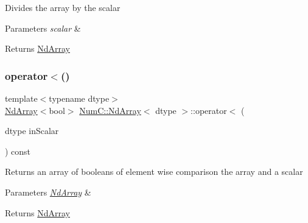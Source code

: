 Divides the array by the scalar


\begin{DoxyParams}{Parameters}
{\em scalar} & \\
\hline
\end{DoxyParams}
\begin{DoxyReturn}{Returns}
\mbox{\hyperlink{class_num_c_1_1_nd_array}{Nd\+Array}} 
\end{DoxyReturn}
\mbox{\label{class_num_c_1_1_nd_array_ae6e2f419585540a0198dd500f2c6a547}} 
\subsubsection{\texorpdfstring{operator$<$()}{operator<()}\hspace{0.1cm}{\footnotesize\ttfamily [1/2]}}
{\footnotesize\ttfamily template$<$typename dtype$>$ \\
\mbox{\hyperlink{class_num_c_1_1_nd_array}{Nd\+Array}}$<$bool$>$ \mbox{\hyperlink{class_num_c_1_1_nd_array}{Num\+C\+::\+Nd\+Array}}$<$ dtype $>$\+::operator$<$ (\begin{DoxyParamCaption}\item[{dtype}]{in\+Scalar }\end{DoxyParamCaption}) const\hspace{0.3cm}{\ttfamily [inline]}}

Returns an array of booleans of element wise comparison the array and a scalar


\begin{DoxyParams}{Parameters}
{\em \mbox{\hyperlink{class_num_c_1_1_nd_array}{Nd\+Array}}} & \\
\hline
\end{DoxyParams}
\begin{DoxyReturn}{Returns}
\mbox{\hyperlink{class_num_c_1_1_nd_array}{Nd\+Array}} 
\end{DoxyReturn}
\mbox{\label{class_num_c_1_1_nd_array_a206b5abfcdd532efadeec123979dcb08}} 
